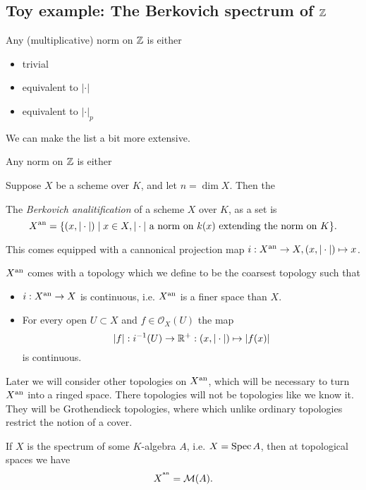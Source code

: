 \subsection{Toy example: The Berkovich spectrum of $\mathbb{Z}$} \label{sec:toy_example:_the_berkovich_spectrum_of_Z}

\begin{theorem}
	[Ostrowski]
	Any (multiplicative) norm on  $\mathbb{Z}$ is either
	\begin{itemize}
		\item  trivial
		\item equivalent to  $|\cdot |$
		\item equivalent to $|\cdot |_p$
	\end{itemize}
\end{theorem}

We can make the list a bit more extensive. 
\begin{corollary}
	Any norm on $\mathbb{Z}$ is either  
\end{corollary}




Suppose $X$ be a scheme over $K$, and let $n = \dim X$. 
Then the 
\begin{definition}
	The \emph{Berkovich analitification} of a scheme $X$ over  $K$, as a set is \[
		X{}^{\text{an}} = \{(x, |\cdot |)  \mid x\in X, |\cdot | \text{ a norm on } k(x) \text{ extending the norm on }K \} 
	.\] 

	This comes equipped with a cannonical projection map $i: X{}^{\text{an}} \to X, (x, |\cdot |) \mapsto  x$.
	
	$X{}^{\text{an}} $ comes with a topology which we define to be the coarsest topology such that 
	\begin{itemize}
		\item $i: X{}^{\text{an}} \to X$ is continuous, i.e. $X{}^{\text{an}}$ is a finer space than  $X$. 
		\item For every open $U \subset X$ and $f \in \mathcal{O}_X(U)$ the map  \[
				|f|: i^{-1}(U) \to \mathbb{R}^{+}: (x, |\cdot |) \mapsto  |f(x)|
		\] 
		is continuous.
	\end{itemize}

\end{definition}
\begin{remark}
	Later we will consider other topologies on $X{}^{\text{an}}$, which will be necessary to turn $X{}^{\text{an}} $ into a ringed space. 
	There topologies will not be topologies like we know it. They will be Grothendieck topologies, where which unlike ordinary topologies restrict the notion of a cover. 
\end{remark}
\begin{remark}
	If $X$ is the spectrum of some $K$-algebra $A$, i.e. $X = \operatorname{Spec} A$, then at topological spaces  we have \[
		X^{{}^{\text{an}}} = \mathcal{M} (A)
	.\] 

\end{remark}



